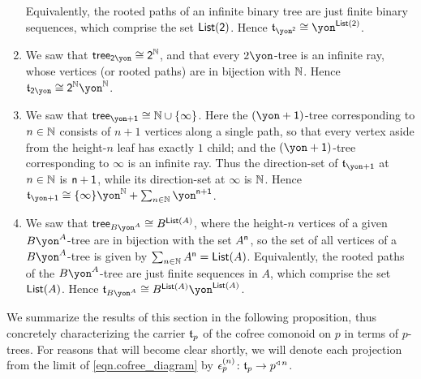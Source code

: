 \documentclass[Book-Poly]{subfiles}
\begin{document}
\begin{exercise}
\begin{solution}
\begin{enumerate}
    Equivalently, the rooted paths of an infinite binary tree are just finite binary sequences, which comprise the set $\mathsf{List}(\textsf{2})$.
    Hence $\ema{t}_{\yon^\2}\iso\yon^{\lst(\2)}$.
    \item We saw that $\tr_{\2\yon}\iso\2^\nn$, and that every $2\yon$-tree is an infinite ray, whose vertices (or rooted paths) are in bijection with $\mathbb{N}$.
    Hence $\ema{t}_{\2\yon}\iso\2^\nn\yon^\nn$.
    \item We saw that $\tr_{\yon+\1}\iso\nn\cup\{\infty\}$.
    Here the $(\yon+\1)$-tree corresponding to $n\in\mathbb{N}$ consists of $n+1$ vertices along a single path, so that every vertex aside from the height-$n$ leaf has exactly $1$ child; and the $(\yon+\1)$-tree corresponding to $\infty$ is an infinite ray.
    Thus the direction-set of $\ema{t}_{\yon+\1}$ at $n\in\mathbb{N}$ is $\mathsf{n}+\textsf{1}$, while its direction-set at $\infty$ is $\mathbb{N}$.
    Hence $\ema{t}_{\yon+\1}\iso\{\infty\}\yon^\nn+\sum_{n\in\nn}\yon^{\ord{n}+\1}$.
    \item We saw that $\tr_{B\yon^A}\iso B^{\lst(A)}$, where the height-$n$ vertices of a given $B\yon^A$-tree are in bijection with the set $A^{\mathsf{n}}$, so the set of all vertices of a $B\yon^A$-tree is given by $\sum_{n\in\mathbb{N}}A^{\mathsf{n}}=\mathsf{List}(A)$.
    Equivalently, the rooted paths of the $B\yon^A$-tree are just finite sequences in $A$, which comprise the set $\mathsf{List}(A)$.
    Hence $\ema{t}_{B\yon^A}\iso B^{\lst(A)}\yon^{\lst(A)}$.
\end{enumerate}
\end{solution}
\end{exercise}

We summarize the results of this section in the following proposition, thus concretely characterizing the carrier $\mathfrak{t}_p$ of the cofree comonoid on $p$ in terms of $p$-trees.
For reasons that will become clear shortly, we will denote each projection from the limit of \eqref{eqn.cofree_diagram} by $\epsilon^{(n)}_p\colon\mathfrak{t}_p\to p^{\mathbin{\triangleleft}\,n}$.
\end{document}

